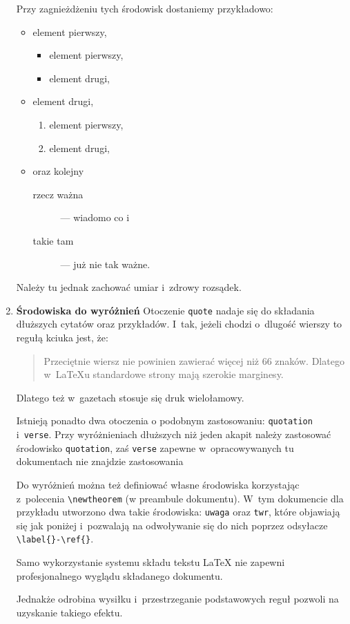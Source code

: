 \begin{enumerate}
Przy zagnieżdżeniu tych środowisk dostaniemy przykładowo:
\begin{itemize}
\item element pierwszy,
  \begin{itemize}
  \item element pierwszy,
  \item element drugi,
  \end{itemize}
\item element drugi,
  \begin{enumerate}
  \item element pierwszy,
  \item element drugi,
  \end{enumerate}
\item oraz kolejny
  \begin{description}
    \item[rzecz ważna] --- wiadomo co i
    \item[takie tam] --- już nie tak ważne.
  \end{description}
\end{itemize}
Należy tu jednak zachować umiar i~zdrowy rozsądek.

\item \textbf{Środowiska do wyróżnień} Otoczenie \verb+quote+ nadaje się do składania dłuższych cytatów oraz przykładów. I~tak, jeżeli chodzi o~dlugość wierszy to regułą
kciuka jest, że:
\begin{quote}
Przeciętnie wiersz nie powinien zawierać więcej niż 66 znaków.
Dlatego w~{\LaTeX}u standardowe strony mają szerokie marginesy.
\end{quote}
Dlatego też w~gazetach stosuje się druk wielołamowy. 

Istnieją ponadto dwa otoczenia o podobnym zastosowaniu:
\verb+quotation+ i~\verb+verse+. Przy wyróżnieniach dłuższych niż
jeden akapit należy zastosować środowisko \verb+quotation+, zaś
\verb+verse+ zapewne w~opracowywanych tu dokumentach nie znajdzie
zastosowania \smiley

Do wyróżnień można też definiować własne środowiska korzystając z~polecenia
\verb+\newtheorem+ (w preambule dokumentu). W~tym dokumencie dla
przykładu utworzono dwa takie środowiska: \verb+uwaga+ oraz
\verb+twr+, które objawiają się jak poniżej i~pozwalają na odwoływanie
się do nich poprzez odsyłacze \texttt{\textbackslash label\{\}-\textbackslash ref\{\}}. 

\begin{uwaga}
  Samo wykorzystanie systemu składu tekstu \LaTeX{} nie zapewni
  profesjonalnego wyglądu składanego dokumentu.
\end{uwaga}

\begin{twr}
  Jednakże odrobina wysiłku i~przestrzeganie podstawowych reguł
  pozwoli na uzyskanie takiego efektu.
\end{twr}

\end{enumerate}

